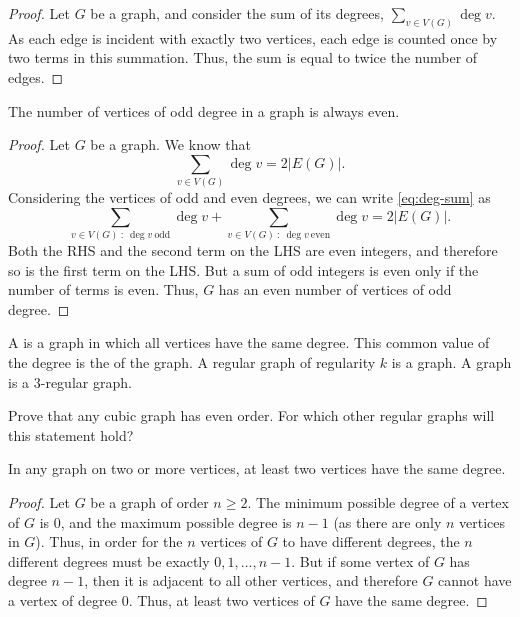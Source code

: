\begin{proof}
Let $G$ be a graph, and consider the sum of its degrees, $\sum_{v \in V(G)} \deg v$. As each edge is incident with exactly two vertices, each edge is counted once by two terms in this summation. Thus, the sum is equal to twice the number of edges.
\end{proof}

\begin{Corollary}
The number of vertices of odd degree in a graph is always even.
\end{Corollary}

\begin{proof}
Let $G$ be a graph. We know that
\begin{equation}
\sum_{v \in V(G)} \deg v = 2 |E(G)|. \label{eq:deg-sum}
\end{equation}
Considering the vertices of odd and even degrees, we can write \eqref{eq:deg-sum} as
\begin{equation}
\sum_{v \in V(G) ~:~ \deg v\ \text{odd}} \deg v + \sum_{v \in V(G) ~:~ \deg v\ \text{even}} \deg v = 2 |E(G)|.
\end{equation}
Both the RHS and the second term on the LHS are even integers, and therefore so is the first term on the LHS. But a sum of odd integers is even only if the number of terms is even. Thus, $G$ has an even number of vertices of odd degree.
\end{proof}

A  is a graph in which all vertices have the same degree. This common value of the degree is the  of the graph. A regular graph of regularity $k$ is a  graph. A  graph is a $3$-regular graph.

\begin{Exercise}
Prove that any cubic graph has even order. For which other regular graphs will this statement hold?
\end{Exercise}

\begin{Theorem}
In any graph on two or more vertices, at least two vertices have the same degree.
\end{Theorem}

\begin{proof}
Let $G$ be a graph of order $n \ge 2$. The minimum possible degree of a vertex of $G$ is $0$, and the maximum possible degree is $n - 1$ (as there are only $n$ vertices in $G$). Thus, in order for the $n$ vertices of $G$ to have different degrees, the $n$ different degrees must be exactly $0, 1, \ldots, n - 1$. But if some vertex of $G$ has degree $n - 1$, then it is adjacent to all other vertices, and therefore $G$ cannot have a vertex of degree $0$. Thus, at least two vertices of $G$ have the same degree.
\end{proof}

